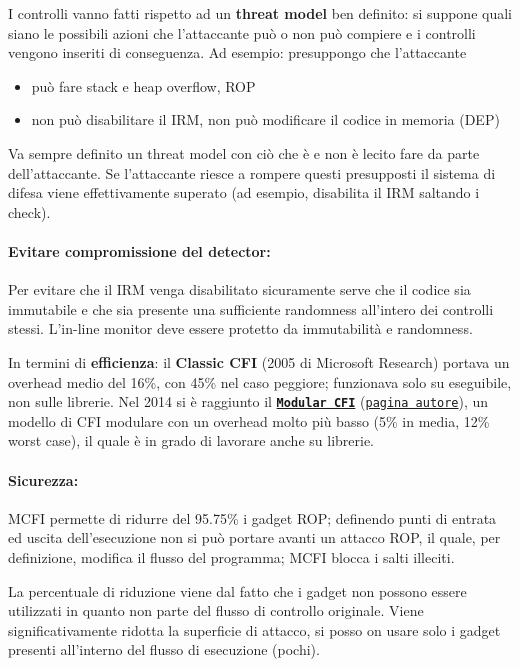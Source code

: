 I controlli vanno fatti rispetto ad un \textbf{threat model} ben definito: si suppone quali siano le possibili azioni che l'attaccante può o non può compiere e i controlli vengono inseriti di conseguenza. Ad esempio: presuppongo che l'attaccante 
\begin{itemize}
	\item può fare stack e heap overflow, ROP
	\item non può disabilitare il IRM, non può modificare il codice in memoria (DEP)
\end{itemize}

Va sempre definito un threat model con ciò che è e non è lecito fare da parte dell'attaccante. Se l'attaccante riesce a rompere questi presupposti il sistema di difesa viene effettivamente superato (ad esempio, disabilita il IRM saltando i check).

\paragraph{Evitare compromissione del detector:} Per evitare che il IRM venga disabilitato sicuramente serve che il codice sia immutabile e che sia presente una sufficiente randomness all'intero dei controlli stessi. L'in-line monitor deve essere protetto da immutabilità e randomness.

In termini di \textbf{efficienza}: il \textbf{Classic CFI} (2005 di Microsoft Research) portava un overhead medio del 16\%, con 45\% nel caso peggiore; funzionava solo su eseguibile, non sulle librerie. Nel 2014 si è raggiunto il \href{https://www.cse.psu.edu/~gxt29/papers/mcfi.pdf}{\textbf{\texttt{Modular CFI}}} (\href{https://www.cse.psu.edu/~gxt29/}{\texttt{pagina autore}}), un modello di CFI modulare con un overhead molto più basso (5\% in media, 12\% worst case), il quale è in grado di lavorare anche su librerie.

\paragraph{Sicurezza:} MCFI permette di ridurre del 95.75\% i gadget ROP; definendo punti di entrata ed uscita dell'esecuzione non si può portare avanti un attacco ROP, il quale, per definizione, modifica il flusso del programma; MCFI blocca i salti illeciti. 

La percentuale di riduzione viene dal fatto che i gadget non possono essere utilizzati in quanto non parte del flusso di controllo originale. Viene significativamente ridotta la superficie di attacco, si posso on usare solo i gadget presenti all'interno del flusso di esecuzione (pochi).

